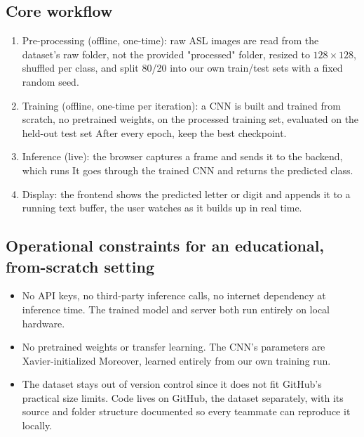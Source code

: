 \documentclass[12pt,a4paper]{article}
\begin{document}
\subsection{Core workflow}

\begin{enumerate}[leftmargin=*]

  \item Pre-processing (offline, one-time): raw ASL images are read from the dataset's raw
  folder, not the provided "processed" folder, resized to $128 \times 128$, shuffled per
  class, and split 80/20 into our own train/test sets with a fixed random seed.

  \item Training (offline, one-time per iteration): a CNN is built and trained from scratch,
  no pretrained weights, on the processed training set, evaluated on the held-out test set
  After every epoch, keep the best checkpoint.

  \item Inference (live): the browser captures a frame and sends it to the backend, which runs
  It goes through the trained CNN and returns the predicted class.

  \item Display: the frontend shows the predicted letter or digit and appends it to a running
  text buffer, the user watches as it builds up in real time.

\end{enumerate}


\subsection{Operational constraints for an educational, from-scratch setting}

\begin{itemize}[leftmargin=*]

  \item No API keys, no third-party inference calls, no internet dependency at inference time.
  The trained model and server both run entirely on local hardware.

  \item No pretrained weights or transfer learning. The CNN's parameters are Xavier-initialized
  Moreover, learned entirely from our own training run.

  \item The dataset stays out of version control since it does not fit GitHub's practical size
  limits. Code lives on GitHub, the dataset separately, with its source and folder structure
  documented so every teammate can reproduce it locally.

\end{itemize}
\end{document}
